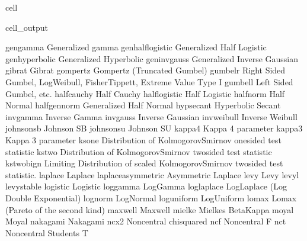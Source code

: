 \documentclass[letterpaper,10pt,english]{jupyterBook}
\begin{document}
\begin{sphinxuseclass}{cell}
\begin{sphinxVerbatimOutput}
\begin{sphinxuseclass}{cell_output}
\begin{sphinxVerbatim}[commandchars=\\\{\}]
   gengamma          \PYGZhy{}\PYGZhy{} Generalized gamma
   genhalflogistic   \PYGZhy{}\PYGZhy{} Generalized Half Logistic
   genhyperbolic     \PYGZhy{}\PYGZhy{} Generalized Hyperbolic
   geninvgauss       \PYGZhy{}\PYGZhy{} Generalized Inverse Gaussian
   gibrat            \PYGZhy{}\PYGZhy{} Gibrat
   gompertz          \PYGZhy{}\PYGZhy{} Gompertz (Truncated Gumbel)
   gumbel\PYGZus{}r          \PYGZhy{}\PYGZhy{} Right Sided Gumbel, Log\PYGZhy{}Weibull, Fisher\PYGZhy{}Tippett, Extreme Value Type I
   gumbel\PYGZus{}l          \PYGZhy{}\PYGZhy{} Left Sided Gumbel, etc.
   halfcauchy        \PYGZhy{}\PYGZhy{} Half Cauchy
   halflogistic      \PYGZhy{}\PYGZhy{} Half Logistic
   halfnorm          \PYGZhy{}\PYGZhy{} Half Normal
   halfgennorm       \PYGZhy{}\PYGZhy{} Generalized Half Normal
   hypsecant         \PYGZhy{}\PYGZhy{} Hyperbolic Secant
   invgamma          \PYGZhy{}\PYGZhy{} Inverse Gamma
   invgauss          \PYGZhy{}\PYGZhy{} Inverse Gaussian
   invweibull        \PYGZhy{}\PYGZhy{} Inverse Weibull
   johnsonsb         \PYGZhy{}\PYGZhy{} Johnson SB
   johnsonsu         \PYGZhy{}\PYGZhy{} Johnson SU
   kappa4            \PYGZhy{}\PYGZhy{} Kappa 4 parameter
   kappa3            \PYGZhy{}\PYGZhy{} Kappa 3 parameter
   ksone             \PYGZhy{}\PYGZhy{} Distribution of Kolmogorov\PYGZhy{}Smirnov one\PYGZhy{}sided test statistic
   kstwo             \PYGZhy{}\PYGZhy{} Distribution of Kolmogorov\PYGZhy{}Smirnov two\PYGZhy{}sided test statistic
   kstwobign         \PYGZhy{}\PYGZhy{} Limiting Distribution of scaled Kolmogorov\PYGZhy{}Smirnov two\PYGZhy{}sided test statistic.
   laplace           \PYGZhy{}\PYGZhy{} Laplace
   laplace\PYGZus{}asymmetric    \PYGZhy{}\PYGZhy{} Asymmetric Laplace
   levy              \PYGZhy{}\PYGZhy{} Levy
   levy\PYGZus{}l
   levy\PYGZus{}stable
   logistic          \PYGZhy{}\PYGZhy{} Logistic
   loggamma          \PYGZhy{}\PYGZhy{} Log\PYGZhy{}Gamma
   loglaplace        \PYGZhy{}\PYGZhy{} Log\PYGZhy{}Laplace (Log Double Exponential)
   lognorm           \PYGZhy{}\PYGZhy{} Log\PYGZhy{}Normal
   loguniform        \PYGZhy{}\PYGZhy{} Log\PYGZhy{}Uniform
   lomax             \PYGZhy{}\PYGZhy{} Lomax (Pareto of the second kind)
   maxwell           \PYGZhy{}\PYGZhy{} Maxwell
   mielke            \PYGZhy{}\PYGZhy{} Mielke\PYGZsq{}s Beta\PYGZhy{}Kappa
   moyal             \PYGZhy{}\PYGZhy{} Moyal
   nakagami          \PYGZhy{}\PYGZhy{} Nakagami
   ncx2              \PYGZhy{}\PYGZhy{} Non\PYGZhy{}central chi\PYGZhy{}squared
   ncf               \PYGZhy{}\PYGZhy{} Non\PYGZhy{}central F
   nct               \PYGZhy{}\PYGZhy{} Non\PYGZhy{}central Student\PYGZsq{}s T

\end{sphinxVerbatim}
\end{sphinxuseclass}
\end{sphinxVerbatimOutput}
\end{sphinxuseclass}
\end{document}
